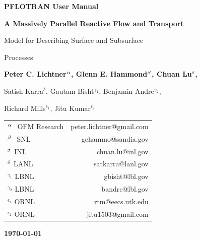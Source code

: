 \begin{center}

\dblline


{\bf\huge PFLOTRAN User Manual}

\vspace{0.5cm}

{\bf\LARGE A Massively Parallel Reactive Flow and Transport 

Model for Describing Surface and Subsurface 

Processes}

\vspace{0.5cm}

{\bf\large Peter C. Lichtner${^{\alpha}}$, Glenn E. Hammond${^{\beta}}$, Chuan Lu${^\sigma}$, 

Satish Karra${^\delta}$, Gautam Bisht$^{\gamma_1}$, Benjamin Andre$^{\gamma_2}$, 

Richard Mills$^{\epsilon_1}$, Jitu Kumar$^{\epsilon_2}$}

\vspace{0.5cm}

\begin{tabular}{lr}
$^{{\alpha}_{~}}$ OFM Research & peter.lichtner@gmail.com\\
$^{{\beta}_{~}}$ SNL & gehammo@sandia.gov\\
$^{\sigma_{~}}$ INL & chuan.lu@inl.gov\\
$^{\delta_{~}}$ LANL & satkarra@lanl.gov\\
$^{\gamma_1^{}}$ LBNL & gbisht@lbl.gov\\
$^{\gamma_2^{}}$ LBNL & bandre@lbl.gov\\
$^{\epsilon_1^{}}$ ORNL & rtm@eecs.utk.edu \\
$^{\epsilon_2^{}}$ ORNL & jitu1503@gmail.com
\end{tabular}

\vspace{0.5cm}

{\bf\large\today}


\vspace{1cm}


\vspace{1cm}

\end{center}

